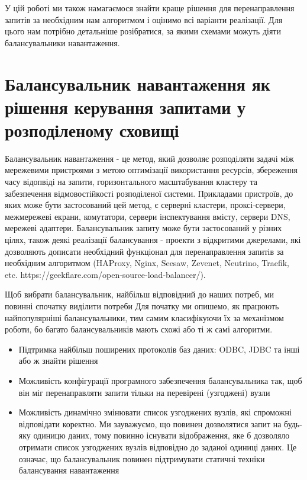 \documentclass[14pt]{vakthesis}
\begin{document}
У цій роботі ми також намагаємося знайти краще рішення для перенаправлення запитів за необхідним нам алгоритмом і оцінимо всі варіанти реалізації. Для цього нам потрібно детальніше розібратися, за якими схемами можуть діяти балансувальники навантаження.


\section{Балансувальник навантаження як рішення керування запитами у розподіленому сховищі}

Балансувальник навантаження - це метод, який дозволяє розподіляти задачі між мережевими пристроями з метою оптимізації використання ресурсів, збереження часу відопвіді на запити, горизонтального масштабування кластеру та забезпечення відмовостійкості розподіленої системи. Прикладами пристроїв, до яких може бути застосований цей метод, є серверні кластери, проксі-сервери, межмережеві екрани, комутатори, сервери інспектування вмісту, сервери DNS, мережеві адаптери. Балансувальник запиту може бути застосований у різних цілях, також деякі реалізації балансування - проекти з відкритими джерелами, які дозволяють дописати необхідний функціонал для перенаправлення запитів за необхідним алгоритмом (HAProxy, Nginx, Seesaw, Zevenet, Neutrino, Traefik, etc. https://geekflare.com/open-source-load-balancer/).


Щоб вибрати балансувальник, найбільш відповідний до наших потреб, ми повинні спочатку виділити потреби Для початку ми опишемо, як працюють найпопулярніші балансувальники, тим самим класифікуючи їх за механізмом роботи, бо багато балансувальників мають схожі або ті ж самі алгоритми. 
\begin{itemize}
\item Підтримка найбільш поширених протоколів баз даних: ODBC, JDBC та інші або ж знайти рішення 
\item Можливість конфігурації програмного забезпечення балансувальника так, щоб він міг перенаправляти запити тільки на перевірені (узгоджені) вузли
\item Можливість динамічно змінювати список узгоджених вузлів, які спроможні відповідати коректно. Ми зауважуємо, що повинен дозволятися запит на будь-яку одиницю даних, тому повинно існувати відображення, яке б дозволяло отримати список узгоджених вузлів відповідно до заданої одиниці даних. Це означає, що балансувальник повинен підтримувати статичні техніки балансування навантаження
\end{itemize}
\end{document}
